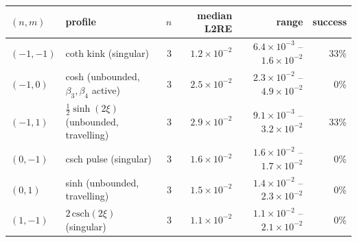 \begin{tabular}{llrrrr}
\toprule
$(n,m)$ & profile & $n$ & median L2RE & range & success \\
\midrule
$(-1,-1)$ & coth kink (singular) & 3 & $1.2\times10^{-2}$ & $6.4\times10^{-3}$ -- $1.6\times10^{-2}$ & 33\% \\
$(-1,0)$ & cosh (unbounded, $\beta_3,\beta_4$ active) & 3 & $2.5\times10^{-2}$ & $2.3\times10^{-2}$ -- $4.9\times10^{-2}$ & 0\% \\
$(-1,1)$ & $\tfrac12\sinh(2\xi)$ (unbounded, travelling) & 3 & $2.9\times10^{-2}$ & $9.1\times10^{-3}$ -- $3.2\times10^{-2}$ & 33\% \\
$(0,-1)$ & csch pulse (singular) & 3 & $1.6\times10^{-2}$ & $1.6\times10^{-2}$ -- $1.7\times10^{-2}$ & 0\% \\
$(0,1)$ & sinh (unbounded, travelling) & 3 & $1.5\times10^{-2}$ & $1.4\times10^{-2}$ -- $2.3\times10^{-2}$ & 0\% \\
$(1,-1)$ & $2\,\mathrm{csch}(2\xi)$ (singular) & 3 & $1.1\times10^{-2}$ & $1.1\times10^{-2}$ -- $2.1\times10^{-2}$ & 0\% \\
\bottomrule
\end{tabular}